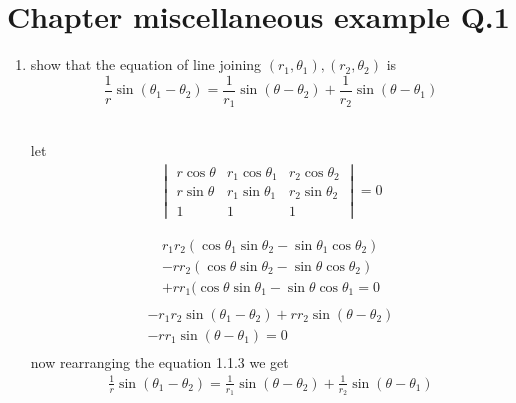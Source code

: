 \documentclass[journal,12pt,twocolumn]{IEEEtran}
\renewcommand\thesection{\arabic{section}}
\begin{document}
\section{ Chapter   miscellaneous example  Q.1}
\renewcommand{\theequation}{\theenumi}
\begin{enumerate}[label=\thesection.\arabic*.,ref=\thesection.\theenumi]
\item show that the equation of line joining $(r_1,\theta_1),(r_2,\theta_2)$
is $$ \frac{1}{r} \sin{(\theta_1-\theta_2)}=\frac{1}{r_1} \sin{(\theta-\theta_2)}+\frac{1}{r_2} \sin{(\theta-\theta_1)}$$\\
\solution

let \begin{align}
    \begin{vmatrix}
    r\cos\theta&r_1\cos\theta_1&r_2\cos\theta_2\\
    r\sin\theta&r_1\sin\theta_1&r_2\sin\theta_2\\
    1&1&1
    \end{vmatrix}
    =0
\end{align}

\begin{align}\nonumber
 r_1r_2(\cos\theta_1\sin\theta_2-\sin\theta_1\cos\theta_2)\\\nonumber
 -rr_2(\cos\theta\sin\theta_2-\sin\theta\cos\theta_2)\\\nonumber
 +rr_1(\cos\theta\sin\theta_1-\sin\theta\cos\theta_1=0\\
\end{align}
\begin{align}\nonumber
-r_1r_2\sin(\theta_1-\theta_2)+rr_2\sin(\theta-\theta_2)\\\nonumber
-rr_1\sin(\theta-\theta_1)=0\\
\end{align}
now rearranging the equation 1.1.3 we get 
\begin{align}
\frac{1}{r} \sin{(\theta_1-\theta_2)}=\frac{1}{r_1} \sin{(\theta-\theta_2)}+\frac{1}{r_2} \sin{(\theta-\theta_1)}
 \end{align}
\end{enumerate}
\end{document}
